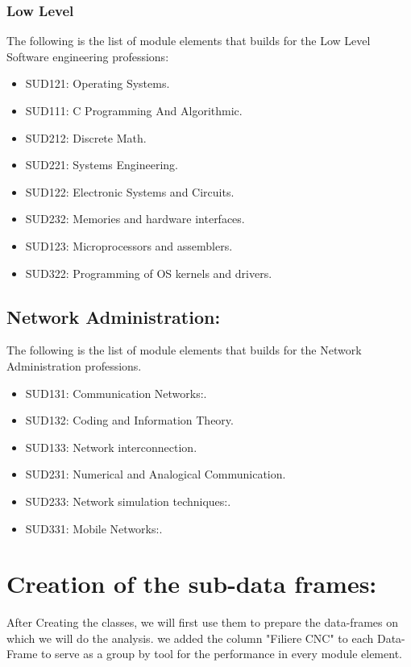 \documentclass[12pt]{extreport}
\begin{document}
\subsubsection{Low Level}
The following is the list of module elements that builds for the Low Level Software engineering  professions:

\begin{itemize}
\item SUD121: Operating Systems.
\item SUD111: C Programming And Algorithmic.
\item SUD212: Discrete Math.
\item SUD221: Systems Engineering.
\item SUD122: Electronic Systems and Circuits.
\item SUD232: Memories and hardware interfaces.
\item SUD123: Microprocessors and assemblers.
\item SUD322: Programming of OS kernels and drivers.

\end{itemize}






\subsection{Network Administration:}
The following is the list of module elements that builds for the Network Administration professions.


\begin{itemize}
\item SUD131: Communication Networks:.
\item SUD132: Coding and Information Theory.
\item SUD133: Network interconnection.
\item SUD231: Numerical and Analogical Communication.
\item SUD233: Network simulation techniques:.
\item SUD331: Mobile Networks:.	
\end{itemize}


\section{Creation of the sub-data frames:}
After Creating the classes, we will first use them to prepare the data-frames on which we will do the analysis. we added the column "Filiere CNC" to each Data-Frame to serve as a group by tool for the performance in every module element.
\end{document}

